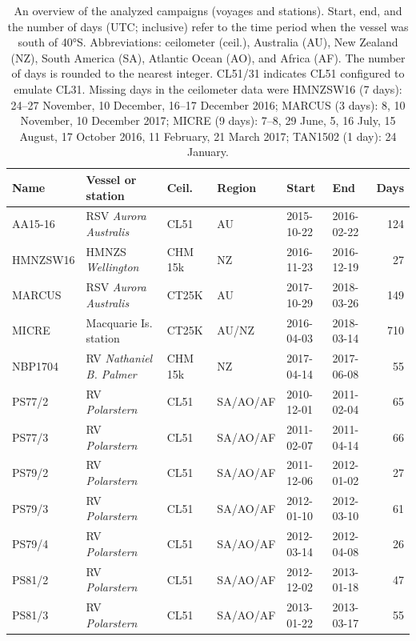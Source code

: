 \documentclass[draft]{agujournal2019}
\begin{document}
\begin{table}[p!]
\caption{
An overview of the analyzed campaigns (voyages and stations). Start, end, and the number of days (UTC; inclusive) refer to the time period when the vessel was south of 40°S. Abbreviations: ceilometer (ceil.), Australia (AU), New Zealand (NZ), South America (SA), Atlantic Ocean (AO), and Africa (AF). The number of days is rounded to the nearest integer. CL51/31 indicates CL51 configured to emulate CL31. Missing days in the ceilometer data were HMNZSW16 (7 days): 24--27 November, 10 December, 16--17 December 2016; MARCUS (3 days): 8, 10 November, 10 December 2017; MICRE (9 days): 7--8, 29 June, 5, 16 July, 15 August, 17 October 2016, 11 February, 21 March 2017; TAN1502 (1 day): 24 January.
}
\label{tab:voyages}
\centering
\small
\begin{tabular}{llllllr}
\textbf{Name} & \textbf{Vessel or station} & \textbf{Ceil.} & \textbf{Region} & \textbf{Start} & \textbf{End} & \textbf{Days}\\
\hline
AA15-16  & RSV \emph{Aurora Australis}   & CL51    & AU       & 2015-10-22 & 2016-02-22 & 124 \\
HMNZSW16 & HMNZS \emph{Wellington}       & CHM 15k & NZ       & 2016-11-23 & 2016-12-19 & 27 \\
MARCUS   & RSV \emph{Aurora Australis}   & CT25K   & AU       & 2017-10-29 & 2018-03-26 & 149 \\
MICRE    & Macquarie Is. station         & CT25K   & AU/NZ    & 2016-04-03 & 2018-03-14 & 710 \\
NBP1704  & RV \emph{Nathaniel B. Palmer} & CHM 15k & NZ       & 2017-04-14 & 2017-06-08 & 55 \\
PS77/2   & RV \emph{Polarstern}          & CL51    & SA/AO/AF & 2010-12-01 & 2011-02-04 & 65 \\
PS77/3   & RV \emph{Polarstern}          & CL51    & SA/AO/AF & 2011-02-07 & 2011-04-14 & 66 \\
PS79/2   & RV \emph{Polarstern}          & CL51    & SA/AO/AF & 2011-12-06 & 2012-01-02 & 27 \\
PS79/3   & RV \emph{Polarstern}          & CL51    & SA/AO/AF & 2012-01-10 & 2012-03-10 & 61 \\
PS79/4   & RV \emph{Polarstern}          & CL51    & SA/AO/AF & 2012-03-14 & 2012-04-08 & 26 \\
PS81/2   & RV \emph{Polarstern}          & CL51    & SA/AO/AF & 2012-12-02 & 2013-01-18 & 47 \\
PS81/3   & RV \emph{Polarstern}          & CL51    & SA/AO/AF & 2013-01-22 & 2013-03-17 & 55 \\

\end{tabular}
\end{table}
\end{document}
